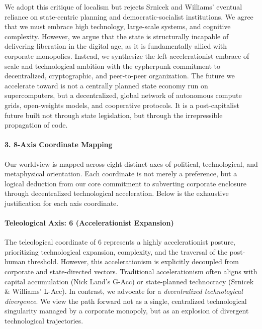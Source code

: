 We adopt this critique of localism but rejects Srnicek and Williams'
eventual reliance on state-centric planning and democratic-socialist
institutions. We agree that we must embrace high technology, large-scale
systems, and cognitive complexity. However, we argue that the state is
structurally incapable of delivering liberation in the digital age, as
it is fundamentally allied with corporate monopolies. Instead, we
synthesize the left-accelerationist embrace of scale and technological
ambition with the cypherpunk commitment to decentralized, cryptographic,
and peer-to-peer organization. The future we accelerate toward is not a
centrally planned state economy run on supercomputers, but a
decentralized, global network of autonomous compute grids, open-weights
models, and cooperative protocols. It is a post-capitalist future built
not through state legislation, but through the irrepressible propagation
of code.

\paragraph{3. 8-Axis Coordinate
Mapping}\label{axis-coordinate-mapping-13}

Our worldview is mapped across eight distinct axes of political,
technological, and metaphysical orientation. Each coordinate is not
merely a preference, but a logical deduction from our core commitment to
subverting corporate enclosure through decentralized technological
acceleration. Below is the exhaustive justification for each axis
coordinate.

\paragraph{Teleological Axis: 6 (Accelerationist
Expansion)}\label{teleological-axis-6-accelerationist-expansion}

The teleological coordinate of 6 represents a highly accelerationist
posture, prioritizing technological expansion, complexity, and the
traversal of the post-human threshold. However, this accelerationism is
explicitly decoupled from corporate and state-directed vectors.
Traditional accelerationism often aligns with capital accumulation (Nick
Land's G-Acc) or state-planned technocracy (Srnicek \& Williams' L-Acc).
In contrast, we advocate for a \emph{decentralized technological
divergence}. We view the path forward not as a single, centralized
technological singularity managed by a corporate monopoly, but as an
explosion of divergent technological trajectories.

